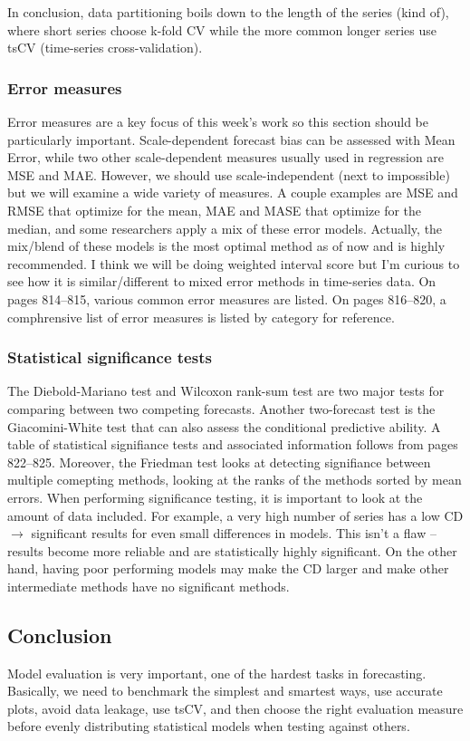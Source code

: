 \documentclass[12pt]{article}
\begin{document}
In conclusion, data partitioning boils down to the length of the series (kind of), where short series choose k-fold CV while the more common longer series use tsCV (time-series cross-validation).

\subsubsection{Error measures}
Error measures are a key focus of this week's work so this section should be particularly important. Scale-dependent forecast bias can be assessed with Mean Error, while two other scale-dependent measures usually used in regression are MSE and MAE. However, we should use scale-independent (next to impossible) but we will examine a wide variety of measures. A couple examples are MSE and RMSE that optimize for the mean, MAE and MASE that optimize for the median, and some researchers apply a mix of these error models. Actually, the mix/blend of these models is the most optimal method as of now and is highly recommended. I think we will be doing weighted interval score but I'm curious to see how it is similar/different to mixed error methods in time-series data. On pages 814--815, various common error measures are listed. On pages 816--820, a comphrensive list of error measures is listed by category for reference. 

\subsubsection{Statistical significance tests}
The Diebold-Mariano test and Wilcoxon rank-sum test are two major tests for comparing between two competing forecasts. Another two-forecast test is the Giacomini-White test that can also assess the conditional predictive ability. A table of statistical signifiance tests and associated information follows from pages 822--825. Moreover, the Friedman test looks at detecting signifiance between multiple comepting methods, looking at the ranks of the methods sorted by mean errors. When performing significance testing, it is important to look at the amount of data included. For example, a very high number of series has a low CD $\rightarrow$ significant results for even small differences in models. This isn't a flaw -- results become more reliable and are statistically highly significant. On the other hand, having poor performing models may make the CD larger and make other intermediate methods have no significant methods.

\subsection{Conclusion}
Model evaluation is very important, one of the hardest tasks in forecasting. Basically, we need to benchmark the simplest and smartest ways, use accurate plots, avoid data leakage, use tsCV, and then choose the right evaluation measure before evenly distributing statistical models when testing against others.
\end{document}
